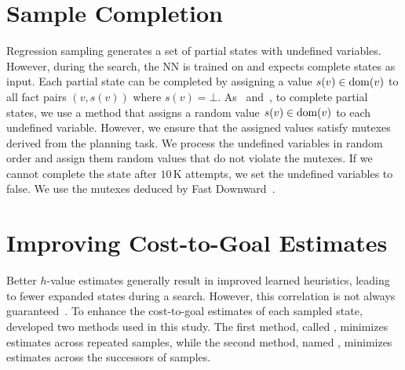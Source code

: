 \documentclass[ppgc,diss,english]{iiufrgs}
\begin{document}

\section{Sample Completion}
\label{sec:sample-completion}
Regression sampling generates a set of partial states with undefined variables. However, during the search, the NN is trained on and expects complete states as input.
Each partial state can be completed by assigning a value $s(v)\in\operatorname{dom}(v)$ to all fact pairs $(v,s(v))$ where $s(v)=\bot$.
As~\citet{Bettker.etal/2022} and~\citet{Ferber.etal/2022}, to complete partial states, we use a method that assigns a random value $s(v) \in \operatorname{dom}(v)$ to each undefined variable. However, we ensure that the assigned values satisfy mutexes derived from the planning task. We process the undefined variables in random order and assign them random values that do not violate the mutexes. If we cannot complete the state after $10$\,K attempts, we set the undefined variables to false. We use the mutexes deduced by Fast Downward~\cite{Helmert/2006,Helmert/2009}.

\section{Improving Cost-to-Goal Estimates}
\label{sec:sample-improving-h}
Better $h$-value estimates generally result in improved learned heuristics, leading to fewer expanded states during a search. However, this correlation is not always guaranteed~\cite{Holte/2010}. To enhance the cost-to-goal estimates of each sampled state,~\citet{Bettker.etal/2022} developed two methods used in this study. The first method, called \sai, minimizes estimates across repeated samples, while the second method, named \sui, minimizes estimates across the successors of samples.
\end{document}
